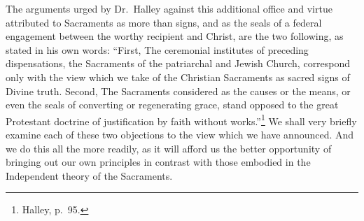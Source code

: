 \documentclass[english,]{book}
\begin{document}
The arguments urged by Dr.~Halley against this additional office and virtue attributed to Sacraments as more than signs, and as the seals of a federal engagement between the worthy recipient and Christ, are the two following, as stated in his own words: ``First, The ceremonial institutes of preceding dispensations, the Sacraments of the patriarchal and Jewish Church, correspond only with the view which we take of the Christian Sacraments as sacred signs of Divine truth. Second, The Sacraments considered as the causes or the means, or even the seals of converting or regenerating grace, stand opposed to the great Protestant doctrine of justification by faith without works.''\footnote{Halley, p.~95.} We shall very briefly examine each of these two objections to the view which we have announced. And we do this all the more readily, as it will afford us the better opportunity of bringing out our own principles in contrast with those embodied in the Independent theory of the Sacraments.
\end{document}
